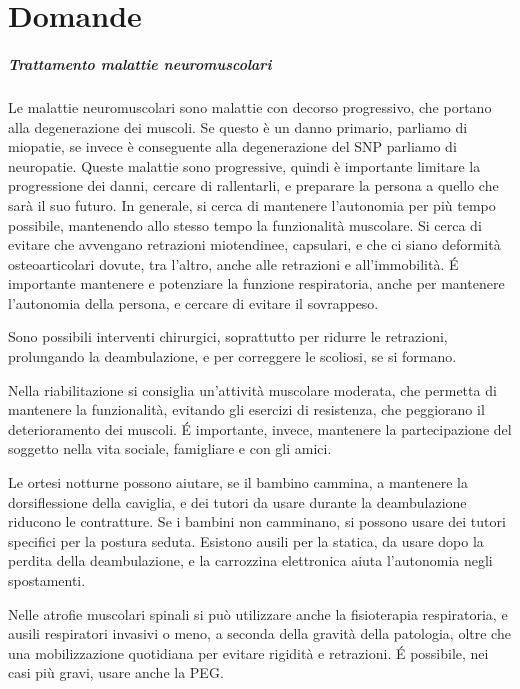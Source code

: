 \chapter{Domande}
\paragraph{Trattamento malattie neuromuscolari}
Le malattie neuromuscolari sono malattie con decorso progressivo, che portano alla degenerazione dei muscoli. Se questo è un danno
primario, parliamo di miopatie, se invece è conseguente alla degenerazione del SNP parliamo di neuropatie.
Queste malattie sono progressive, quindi è importante limitare la progressione dei danni, cercare di rallentarli, e preparare la persona
a quello che sarà il suo futuro. In generale, si cerca di mantenere l'autonomia per più tempo possibile, mantenendo allo stesso tempo la
funzionalità muscolare. Si cerca di evitare che avvengano retrazioni miotendinee, capsulari, e che ci siano deformità osteoarticolari
dovute, tra l'altro, anche alle retrazioni e all'immobilità. \'E importante mantenere e potenziare la funzione respiratoria, anche per
mantenere l'autonomia della persona, e cercare di evitare il sovrappeso.

Sono possibili interventi chirurgici, soprattutto per ridurre le retrazioni, prolungando la deambulazione, e per correggere le scoliosi,
se si formano.

Nella riabilitazione si consiglia un'attività muscolare moderata, che permetta di mantenere la funzionalità, evitando gli esercizi di
resistenza, che peggiorano il deterioramento dei muscoli. \'E importante, invece, mantenere la partecipazione del soggetto nella vita
sociale, famigliare e con gli amici.

Le ortesi notturne possono aiutare, se il bambino cammina, a mantenere la dorsiflessione della caviglia, e dei tutori da usare durante
la deambulazione riducono le contratture. Se i bambini non camminano, si possono usare dei tutori specifici per la postura seduta.
Esistono ausili per la statica, da usare dopo la perdita della deambulazione, e la carrozzina elettronica aiuta l'autonomia negli
spostamenti.

Nelle atrofie muscolari spinali si può utilizzare anche la fisioterapia respiratoria, e ausili respiratori invasivi o meno, a seconda
della gravità della patologia, oltre che una mobilizzazione quotidiana per evitare rigidità e retrazioni. \'E possibile, nei casi più
gravi, usare anche la PEG. 

